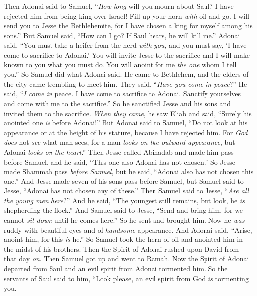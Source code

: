 \begin{biblechapter} %
 Then Adonai said to Samuel, “\textit{How long} will you mourn about Saul? I have rejected him from being king over Israel! Fill up your horn \textit{with} oil and go. I will send you to Jesse the Bethlehemite, for I have chosen a king for myself among his sons.”
\verse But Samuel said, “How can I go? If Saul hears, he will kill me.” Adonai said, “You must take a heifer from the herd \textit{with you}, and you must say, ‘I have come to sacrifice to Adonai.’
\verse You will invite Jesse to the sacrifice and I will make known to you what you must do. You will anoint for me \textit{the one} whom I tell you.”
\verse So Samuel did what Adonai said. He came to Bethlehem, and the elders of the city came trembling to meet him. They said, “\textit{Have you come in peace}?”
\verse He said, “\textit{I come in} peace. I have come to sacrifice to Adonai. Sanctify yourselves and come with me to the sacrifice.” So he sanctified Jesse and his sons and invited them to the sacrifice.
\verse \textit{When they came}, he saw Eliab and said, “Surely his anointed one \textit{is} before Adonai!”
\verse But Adonai said to Samuel, “Do not look at his appearance or at the height of his stature, because I have rejected him. For \textit{God does} not \textit{see} what man sees, for a man \textit{looks on the outward appearance}, but Adonai \textit{looks on the heart}.”
\verse Then Jesse called Abinadab and made him pass before Samuel, and he said, “This one also Adonai has not chosen.”
\verse So Jesse made Shammah pass \textit{before Samuel}, but he said, “Adonai also has not chosen this one.”
\verse And Jesse made seven of his sons pass before Samuel, but Samuel said to Jesse, “Adonai has not chosen any of these.”
\verse Then Samuel said to Jesse, “\textit{Are all the young men here}?” And he said, “The youngest still remains, but look, he \textit{is} shepherding the flock.” And Samuel said to Jesse, “Send and bring him, for we cannot \textit{sit down} until he comes here.”
\verse So he sent and brought him. Now he \textit{was} ruddy with beautiful eyes and of \textit{handsome} appearance. And Adonai said, “Arise, anoint him, for this \textit{is} he.”
\verse So Samuel took the horn of oil and anointed him in the midst of his brothers. Then the Spirit of Adonai rushed upon David from that day \textit{on}. Then Samuel got up and went to Ramah.
 Now the Spirit of Adonai departed from Saul and an evil spirit from Adonai tormented him.
\verse So the servants of Saul said to him, “Look please, an evil spirit from God \textit{is} tormenting you.

\end{biblechapter}
